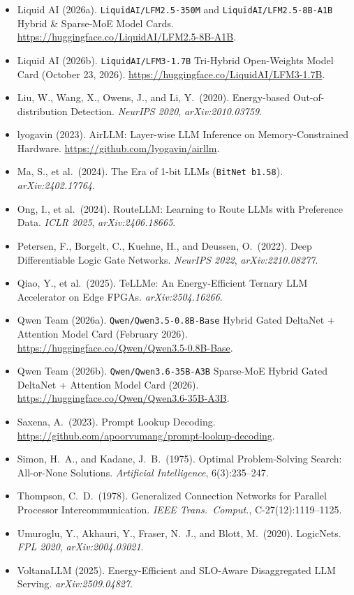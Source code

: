 \documentclass[10pt]{article}
\begin{document}
{\begin{itemize}
  \item Liquid AI (2026a). \texttt{LiquidAI/LFM2.5-350M} and \texttt{LiquidAI/LFM2.5-8B-A1B} Hybrid \& Sparse-MoE Model Cards. \url{https://huggingface.co/LiquidAI/LFM2.5-8B-A1B}.
  \item Liquid AI (2026b). \texttt{LiquidAI/LFM3-1.7B} Tri-Hybrid Open-Weights Model Card (October 23, 2026). \url{https://huggingface.co/LiquidAI/LFM3-1.7B}.
  \item Liu, W., Wang, X., Owens, J., and Li, Y.\ (2020). Energy-based Out-of-distribution Detection. \emph{NeurIPS 2020}, \emph{arXiv:2010.03759}.
  \item lyogavin (2023). AirLLM: Layer-wise LLM Inference on Memory-Constrained Hardware. \url{https://github.com/lyogavin/airllm}.
  \item Ma, S., et al.\ (2024). The Era of 1-bit LLMs (\texttt{BitNet b1.58}). \emph{arXiv:2402.17764}.
  \item Ong, I., et al.\ (2024). RouteLLM: Learning to Route LLMs with Preference Data. \emph{ICLR 2025}, \emph{arXiv:2406.18665}.
  \item Petersen, F., Borgelt, C., Kuehne, H., and Deussen, O.\ (2022). Deep Differentiable Logic Gate Networks. \emph{NeurIPS 2022}, \emph{arXiv:2210.08277}.
  \item Qiao, Y., et al.\ (2025). TeLLMe: An Energy-Efficient Ternary LLM Accelerator on Edge FPGAs. \emph{arXiv:2504.16266}.
  \item Qwen Team (2026a). \texttt{Qwen/Qwen3.5-0.8B-Base} Hybrid Gated DeltaNet + Attention Model Card (February 2026). \url{https://huggingface.co/Qwen/Qwen3.5-0.8B-Base}.
  \item Qwen Team (2026b). \texttt{Qwen/Qwen3.6-35B-A3B} Sparse-MoE Hybrid Gated DeltaNet + Attention Model Card (2026). \url{https://huggingface.co/Qwen/Qwen3.6-35B-A3B}.
  \item Saxena, A.\ (2023). Prompt Lookup Decoding. \url{https://github.com/apoorvumang/prompt-lookup-decoding}.
  \item Simon, H.\ A., and Kadane, J.\ B.\ (1975). Optimal Problem-Solving Search: All-or-None Solutions. \emph{Artificial Intelligence}, 6(3):235--247.
  \item Thompson, C.\ D.\ (1978). Generalized Connection Networks for Parallel Processor Intercommunication. \emph{IEEE Trans.\ Comput.}, C-27(12):1119--1125.
  \item Umuroglu, Y., Akhauri, Y., Fraser, N.\ J., and Blott, M.\ (2020). LogicNets. \emph{FPL 2020}, \emph{arXiv:2004.03021}.
  \item VoltanaLLM (2025). Energy-Efficient and SLO-Aware Disaggregated LLM Serving. \emph{arXiv:2509.04827}.

\end{itemize}}
\end{document}
